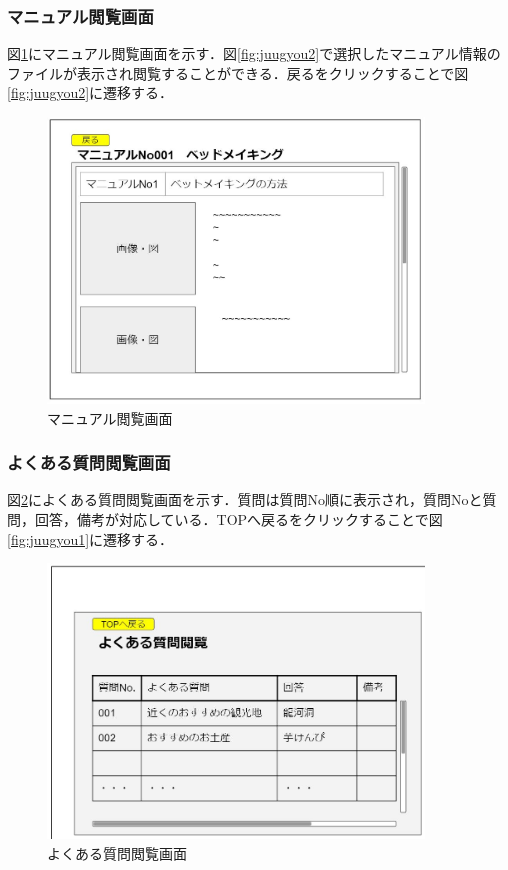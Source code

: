 \documentclass[main]{subfiles}
\begin{document}
\subsubsection{マニュアル閲覧画面}
図\ref{fig:juugyou3}にマニュアル閲覧画面を示す．図\ref{fig:juugyou2}で選択したマニュアル情報のファイルが表示され閲覧することができる．戻るをクリックすることで図\ref{fig:juugyou2}に遷移する．

\begin{figure}[H]
 \centering
   \includegraphics[width=100mm]{UI-umino/juugyou3.JPG}
 \caption{マニュアル閲覧画面}
 \label{fig:juugyou3}
\end{figure}

\subsubsection{よくある質問閲覧画面}
図\ref{fig:juugyou4}によくある質問閲覧画面を示す．質問は質問No順に表示され，質問Noと質問，回答，備考が対応している．TOPへ戻るをクリックすることで図\ref{fig:juugyou1}に遷移する．
\begin{figure}[H]
 \centering
   \includegraphics[width=100mm]{UI-umino/juugyou4.JPG}
 \caption{よくある質問閲覧画面}
 \label{fig:juugyou4}
\end{figure}
\end{document}
